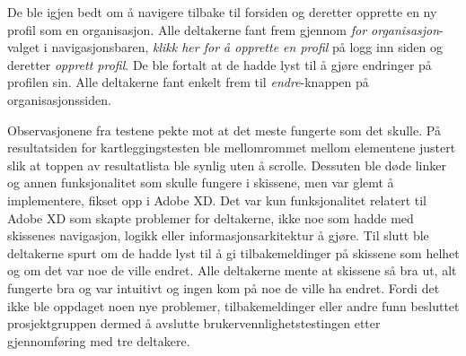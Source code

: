 De ble igjen bedt om å navigere tilbake til forsiden og deretter opprette en ny profil som en organisasjon. Alle deltakerne fant frem gjennom {\em for organisasjon}-valget i navigasjonsbaren, {\em klikk her for å opprette en profil} på logg inn siden og deretter {\em opprett profil}. De ble fortalt at de hadde lyst til å gjøre endringer på profilen sin. Alle deltakerne fant enkelt frem til {\em endre}-knappen på organisasjonssiden.

Observasjonene fra testene pekte mot at det meste fungerte som det skulle. På resultatsiden for kartleggingstesten ble mellomrommet mellom elementene justert slik at toppen av resultatlista ble synlig uten å scrolle. Dessuten ble døde linker og annen funksjonalitet som skulle fungere i skissene, men var glemt å implementere, fikset opp i Adobe XD. Det var kun funksjonalitet relatert til Adobe XD som skapte problemer for deltakerne, ikke noe som hadde med skissenes navigasjon, logikk eller informasjonsarkitektur å gjøre. Til slutt ble deltakerne spurt om de hadde lyst til å gi tilbakemeldinger på skissene som helhet og om det var noe de ville endret. Alle deltakerne mente at skissene så bra ut, alt fungerte bra og var intuitivt og ingen kom på noe de ville ha endret. Fordi det ikke ble oppdaget noen nye problemer, tilbakemeldinger eller andre funn besluttet prosjektgruppen dermed å avslutte brukervennlighetstestingen etter gjennomføring med tre deltakere.

